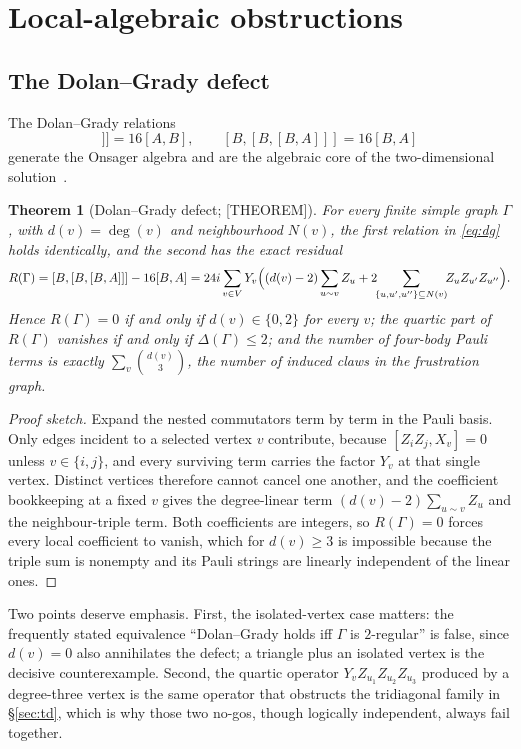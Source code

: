 \documentclass[11pt]{article}
\newtheorem{theorem}{Theorem}[section]
\theoremstyle{definition}
\begin{document}
\section{Local-algebraic obstructions}

\subsection{The Dolan--Grady defect}\label{sec:dg}
The Dolan--Grady relations
\begin{equation}
[A,[A,[A,B]]]=16[A,B],\qquad [B,[B,[B,A]]]=16[B,A]
\label{eq:dg}
\end{equation}
generate the Onsager algebra and are the algebraic core of the two-dimensional
solution~\cite{dolangrady1982,davies1990_onsager}.

\begin{theorem}[Dolan--Grady defect; {[THEOREM]}]\label{thm:dg}
For every finite simple graph $\Gamma$, with $d(v)=\deg(v)$ and neighbourhood $N(v)$, the first
relation in \eqref{eq:dg} holds identically, and the second has the exact residual
\begin{equation}
R(\Gamma)=[B,[B,[B,A]]]-16[B,A]
=24i\sum_{v\in V}Y_v\Bigl((d(v)-2)\sum_{u\sim v}Z_u
+2\!\!\sum_{\{u,u',u''\}\subseteq N(v)}\!\!Z_uZ_{u'}Z_{u''}\Bigr).
\label{eq:defect}
\end{equation}
Hence $R(\Gamma)=0$ if and only if $d(v)\in\{0,2\}$ for every $v$; the quartic part of $R(\Gamma)$
vanishes if and only if $\Delta(\Gamma)\le2$; and the number of four-body Pauli terms is exactly
$\sum_v\binom{d(v)}{3}$, the number of induced claws in the frustration graph.
\end{theorem}

\begin{proof}[Proof sketch]
Expand the nested commutators term by term in the Pauli basis. Only edges incident to a selected
vertex $v$ contribute, because $[Z_iZ_j,X_v]=0$ unless $v\in\{i,j\}$, and every surviving term
carries the factor $Y_v$ at that single vertex. Distinct vertices therefore cannot cancel one
another, and the coefficient bookkeeping at a fixed $v$ gives the degree-linear term
$(d(v)-2)\sum_{u\sim v}Z_u$ and the neighbour-triple term. Both coefficients are integers, so
$R(\Gamma)=0$ forces every local coefficient to vanish, which for $d(v)\ge3$ is impossible because
the triple sum is nonempty and its Pauli strings are linearly independent of the linear ones.
\end{proof}

Two points deserve emphasis. First, the isolated-vertex case matters: the frequently stated
equivalence ``Dolan--Grady holds iff $\Gamma$ is $2$-regular'' is false, since $d(v)=0$ also
annihilates the defect; a triangle plus an isolated vertex is the decisive counterexample. Second,
the quartic operator $Y_vZ_{u_1}Z_{u_2}Z_{u_3}$ produced by a degree-three vertex is the same
operator that obstructs the tridiagonal family in \S\ref{sec:td}, which is why those two no-gos,
though logically independent, always fail together.
\end{document}
